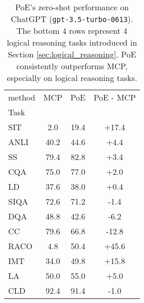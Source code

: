 \begin{table}[h]
\centering
\caption{PoE's zero-shot performance on ChatGPT (\texttt{gpt-3.5-turbo-0613}). The bottom 4 rows represent 4 logical reasoning tasks introduced in Section \ref{sec:logical_reasoning}. PoE consistently outperforms MCP, especially on logical reasoning tasks.}
\label{tab:llm}
\begin{tabular}{l|c|c|c}
method & MCP & PoE & PoE - MCP \\
Task &  &  &  \\
SIT & 2.0 & 19.4 & +17.4 \\
ANLI & 40.2 & 44.6 & +4.4 \\
SS & 79.4 & 82.8 & +3.4 \\
CQA & 75.0 & 77.0 & +2.0 \\
LD & 37.6 & 38.0 & +0.4 \\
SIQA & 72.6 & 71.2 & -1.4 \\
DQA & 48.8 & 42.6 & -6.2 \\
CC & 79.6 & 66.8 & -12.8 \\
RACO & 4.8 & 50.4 & +45.6 \\
IMT & 34.0 & 49.8 & +15.8 \\
LA & 50.0 & 55.0 & +5.0 \\
CLD & 92.4 & 91.4 & -1.0 \\
\end{tabular}
\end{table}
